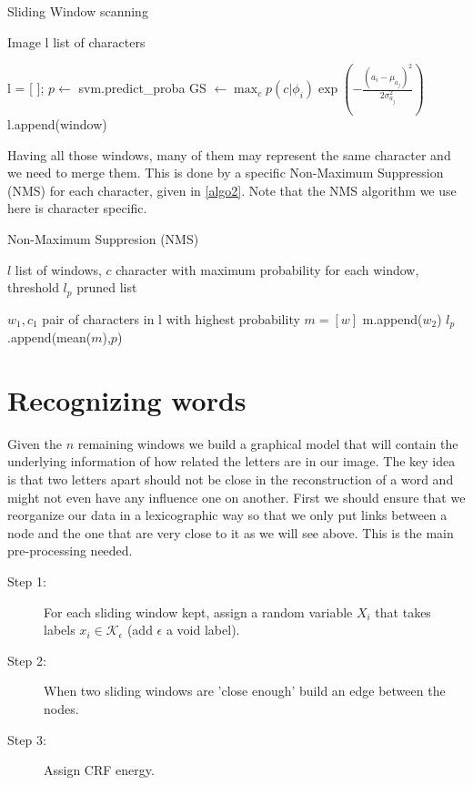 \documentclass[10pt,a4paper]{article}
\begin{document}
\begin{algorithm}
\caption{Sliding Window scanning}
\label{algo1}
\begin{algorithmic}
\Require Image
\Ensure l list of characters

\State l = [ ]; 
	\State $p \leftarrow$ svm.predict\_proba
	\State GS $\leftarrow \max_c p(c|\phi_i) \exp\left( - \frac{(a_i - \mu_{a_j})^2}{2\sigma_{a_j}^2} \right)$
		\State l.append(window) 
	\EndIf
\EndFor
\end{algorithmic}
\end{algorithm}

Having all those windows, many of them may represent the same character and we need to merge them. This is done by a specific Non-Maximum Suppression (NMS) for each character, given in \ref{algo2}. Note that the NMS algorithm we use here is character specific.

\begin{algorithm}
\caption{Non-Maximum Suppresion (NMS)}
\label{algo2}
\begin{algorithmic}
\Require $l$ list of windows, $c$ character with maximum probability for each window, threshold
\Ensure $l_p$ pruned list

	\State $w_1, c_1$ pair of characters in l with highest probability
	\State $m = [w]$
			m.append($w_2$)
		\EndIf
	\EndFor
	\State $l_p$.append(mean($m$),$p$)
\EndWhile
\end{algorithmic}
\end{algorithm}



\section{Recognizing words}

Given the $n$ remaining windows we build a graphical model that will contain the underlying information of how related the letters are in our image. The key idea is that two letters apart should not be close in the reconstruction of a word and might not even have any influence one on another. First we should ensure that we reorganize our data in a lexicographic way so that we only put links between a node and the one that are very close to it as we will see above. This is the main pre-processing needed. 
\begin{description}
\item[Step 1: ] For each sliding window kept, assign a random variable $X_i$ that takes labels $x_i \in \mathcal{K}_{\epsilon}$ (add $\epsilon$ a void label).
\item[Step 2: ] When two sliding windows are 'close enough' build an edge between the nodes.
\item[Step 3: ] Assign CRF energy.
\end{description}
\end{document}
